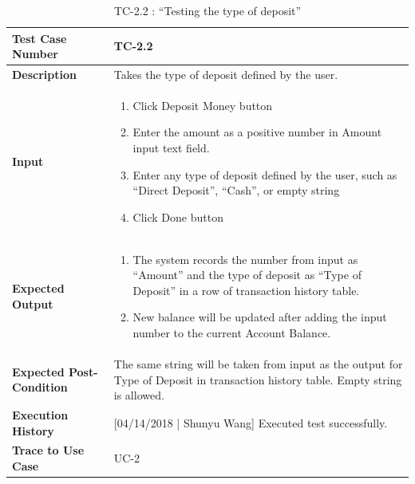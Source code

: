 \documentclass[12pt]{article}
\begin{document}
\begin{table}[H]
\caption{TC-2.2 : “Testing the type of deposit”}
\begin{center}
\begin{tabular}{|p{5.5	cm}|p{11cm}|}
\hline
\bf Test Case Number & 
TC-2.2 \\
\hline
\bf Description & 
Takes the type of deposit defined by the user.\\
\hline
\bf Input & 
\begin{enumerate}
  \item Click Deposit Money button
  \item Enter the amount as a positive number in Amount input text field.
  \item Enter any type of deposit defined by the user, such as “Direct Deposit”, “Cash”, or empty string
  \item Click Done button
\end{enumerate} \\
\hline
\bf Expected Output & 
\begin{enumerate}
  \item The system records the number from input as “Amount” and the type of deposit as “Type of Deposit” in a row of transaction history table.
  \item New balance will be updated after adding the input number to the current Account Balance.
\end{enumerate} \\
\hline
\bf Expected Post-Condition & 
The same string will be taken from input as the output for Type of Deposit in transaction history table. Empty string is allowed.\\
\hline
\bf Execution History & 
[04/14/2018 | Shunyu Wang] Executed test successfully.\\
\hline
\bf Trace to Use Case & 
UC-2\\
\hline

\end{tabular}
\end{center}
\end{table}
\end{document}
